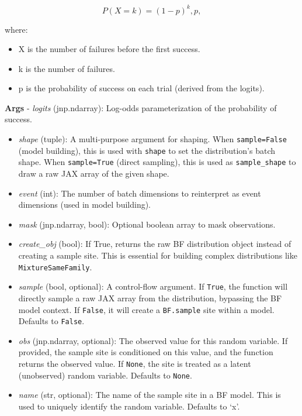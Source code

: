 \documentclass[
  letterpaper,
  DIV=11,
  numbers=noendperiod]{scrartcl}
\providecommand{\tightlist}{%
  \setlength{\itemsep}{0pt}\setlength{\parskip}{0pt}}\usepackage{longtable,booktabs,array}
\begin{document}
\[
P(X = k) = (1 - p)^k , p,
\]

where:

\begin{itemize}
\tightlist
\item
  X is the number of failures before the first success.
\item
  k is the number of failures.
\item
  p is the probability of success on each trial (derived from the
  logits).
\end{itemize}

\textbf{Args} - \emph{logits} (jnp.ndarray): Log-odds parameterization
of the probability of success.

\begin{itemize}
\item
  \emph{shape} (tuple): A multi-purpose argument for shaping. When
  \texttt{sample=False} (model building), this is used with
  \texttt{shape} to set the distribution's batch shape. When
  \texttt{sample=True} (direct sampling), this is used as
  \texttt{sample\_shape} to draw a raw JAX array of the given shape.
\item
  \emph{event} (int): The number of batch dimensions to reinterpret as
  event dimensions (used in model building).
\item
  \emph{mask} (jnp.ndarray, bool): Optional boolean array to mask
  observations.
\item
  \emph{create\_obj} (bool): If True, returns the raw BF distribution
  object instead of creating a sample site. This is essential for
  building complex distributions like \texttt{MixtureSameFamily}.
\item
  \emph{sample} (bool, optional): A control-flow argument. If
  \texttt{True}, the function will directly sample a raw JAX array from
  the distribution, bypassing the BF model context. If \texttt{False},
  it will create a \texttt{BF.sample} site within a model. Defaults to
  \texttt{False}.
\item
  \emph{obs} (jnp.ndarray, optional): The observed value for this random
  variable. If provided, the sample site is conditioned on this value,
  and the function returns the observed value. If \texttt{None}, the
  site is treated as a latent (unobserved) random variable. Defaults to
  \texttt{None}.
\item
  \emph{name} (str, optional): The name of the sample site in a BF
  model. This is used to uniquely identify the random variable. Defaults
  to `x'.
\end{itemize}
\end{document}
